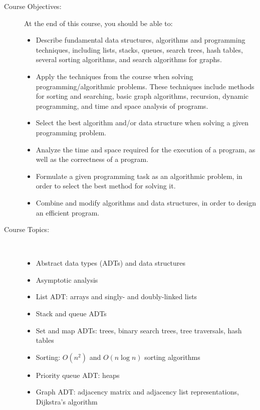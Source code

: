 \documentclass [letterpaper,11pt]{article}
\begin{document}
\begin{description}
\item[Course Objectives:]
At the end of this course, you should be able to:
\begin{itemize} \setlength{\itemsep}{0em}\setlength{\parskip}{0pt}
	\item Describe fundamental data structures, algorithms and programming techniques, including lists, stacks, queues, search trees, hash tables, several sorting algorithms, and search algorithms for graphs.
	\item Apply the techniques from the course when solving programming/algorithmic problems. These techniques include methods for sorting and searching, basic graph algorithms, recursion, dynamic programming, and time and space analysis of programs.
	\item Select the best algorithm and/or data structure when solving a given programming problem.
	\item Analyze the time and space required for the execution of a program, as well as the correctness of a program.
	\item Formulate a given programming task as an algorithmic problem, in order to select the best method for solving it.
	\item Combine and modify algorithms and data structures, in order to design an efficient program.
\end{itemize}



\item[Course Topics:]\
\begin{itemize} %
	\item Abstract data types (ADTs) and data structures
	\item Asymptotic analysis
	\item List ADT: arrays and singly- and doubly-linked lists
	\item Stack and queue ADTs
	\item Set and map ADTs: trees, binary search trees, tree traversals, hash tables
	\item Sorting: $O(n^2)$ and $O(n \log n)$ sorting algorithms
	\item Priority queue ADT: heaps
	\item Graph ADT: adjacency matrix and adjacency list representations, Dijkstra's algorithm
\end{itemize}


\end{description}
\end{document}
